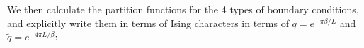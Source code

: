 We then calculate the partition functions for the 4 types of boundary conditions, and explicitly write them in terms of Ising characters in terms of $ q  = e^{-\pi \beta /L} $ and $ \tilde{q} = e^{-4\pi L/\beta} $:
